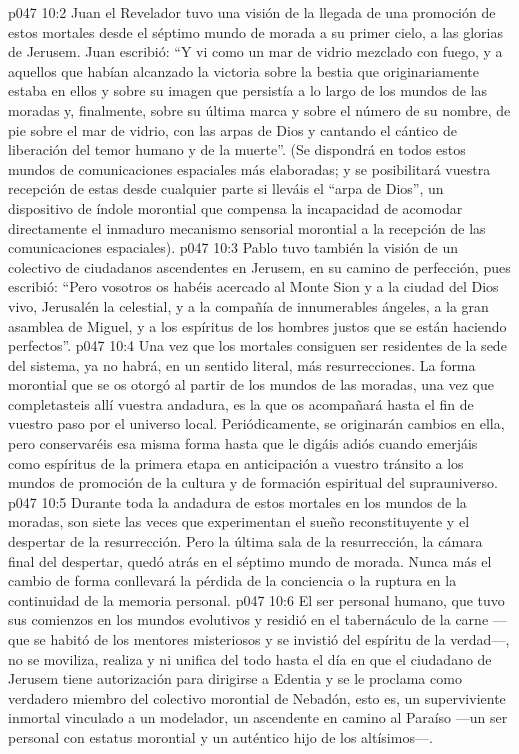 \vs p047 10:2 \pc Juan el Revelador tuvo una visión de la llegada de una promoción de estos mortales desde el séptimo mundo de morada a su primer cielo, a las glorias de Jerusem. Juan escribió: “Y vi como un mar de vidrio mezclado con fuego, y a aquellos que habían alcanzado la victoria sobre la bestia que originariamente estaba en ellos y sobre su imagen que persistía a lo largo de los mundos de las moradas y, finalmente, sobre su última marca y sobre el número de su nombre, de pie sobre el mar de vidrio, con las arpas de Dios y cantando el cántico de liberación del temor humano y de la muerte”. (Se dispondrá en todos estos mundos de comunicaciones espaciales más elaboradas; y se posibilitará vuestra recepción de estas desde cualquier parte si lleváis el “arpa de Dios”, un dispositivo de índole morontial que compensa la incapacidad de acomodar directamente el inmaduro mecanismo sensorial morontial a la recepción de las comunicaciones espaciales).
\vs p047 10:3 Pablo tuvo también la visión de un colectivo de ciudadanos ascendentes en Jerusem, en su camino de perfección, pues escribió: “Pero vosotros os habéis acercado al Monte Sion y a la ciudad del Dios vivo, Jerusalén la celestial, y a la compañía de innumerables ángeles, a la gran asamblea de Miguel, y a los espíritus de los hombres justos que se están haciendo perfectos”.
\vs p047 10:4 \pc Una vez que los mortales consiguen ser residentes de la sede del sistema, ya no habrá, en un sentido literal, más resurrecciones. La forma morontial que se os otorgó al partir de los mundos de las moradas, una vez que completasteis allí vuestra andadura, es la que os acompañará hasta el fin de vuestro paso por el universo local. Periódicamente, se originarán cambios en ella, pero conservaréis esa misma forma hasta que le digáis adiós cuando emerjáis como espíritus de la primera etapa en anticipación a vuestro tránsito a los mundos de promoción de la cultura y de formación espiritual del suprauniverso.
\vs p047 10:5 Durante toda la andadura de estos mortales en los mundos de la moradas, son siete las veces que experimentan el sueño reconstituyente y el despertar de la resurrección. Pero la última sala de la resurrección, la cámara final del despertar, quedó atrás en el séptimo mundo de morada. Nunca más el cambio de forma conllevará la pérdida de la conciencia o la ruptura en la continuidad de la memoria personal.
\vs p047 10:6 \pc El ser personal humano, que tuvo sus comienzos en los mundos evolutivos y residió en el tabernáculo de la carne ---que se habitó de los mentores misteriosos y se invistió del espíritu de la verdad---, no se moviliza, realiza y ni unifica del todo hasta el día en que el ciudadano de Jerusem tiene autorización para dirigirse a Edentia y se le proclama como verdadero miembro del colectivo morontial de Nebadón, esto es, un superviviente inmortal vinculado a un modelador, un ascendente en camino al Paraíso ---un ser personal con estatus morontial y un auténtico hijo de los altísimos---.
